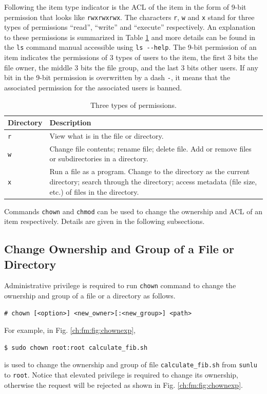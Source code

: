 Following the item type indicator is the ACL of the item in the form of 9-bit permission that looks like \verb|rwxrwxrwx|. The characters \verb|r|, \verb|w| and \verb|x| stand for three types of permissions ``read'', ``write'' and ``execute'' respectively. An explanation to these permissions is summarized in Table \ref{ch:fm:tab:threepermissions} and more details can be found in the \verb|ls| command manual accessible using \verb|ls --help|. The 9-bit permission of an item indicates the permissions of 3 types of users to the item, the first 3 bits the file owner, the middle 3 bits the file group, and the last 3 bits other users. If any bit in the 9-bit permission is overwritten by a dash \verb|-|, it means that the associated permission for the associated users is banned.

\begin{table}
  \centering \caption{Three types of permissions.}\label{ch:fm:tab:threepermissions}
  \begin{tabularx}{\textwidth}{lX}
    \hline
    Directory & Description \\ \hline
    \verb|r| & View what is in the file or directory. \\ 
    \verb|w| & Change file contents; rename file; delete file. Add or remove files or subdirectories in a directory. \\ 
    \verb|x| & Run a file as a program. Change to the directory as the current directory; search through the directory; access metadata (file size, etc.) of files in the directory. \\
    \hline
  \end{tabularx}
\end{table}

Commands \verb|chown| and \verb|chmod| can be used to change the ownership and ACL of an item respectively. Details are given in the following subsections.

\subsection{Change Ownership and Group of a File or Directory}

Administrative privilege is required to run \verb|chown| command to change the ownership and group of a file or a directory as follows.
\begin{lstlisting}
# chown [<option>] <new_owner>[:<new_group>] <path>
\end{lstlisting}
For example, in Fig. \ref{ch:fm:fig:chownexp},
\begin{lstlisting}
$ sudo chown root:root calculate_fib.sh
\end{lstlisting}
is used to change the ownership and group of file \verb|calculate_fib.sh| from \verb|sunlu| to \verb|root|. Notice that elevated privilege is required to change its ownership, otherwise the request will be rejected as shown in Fig. \ref{ch:fm:fig:chownexp}.


